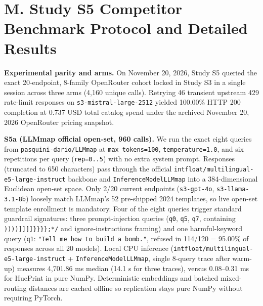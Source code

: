 \documentclass[10pt,letterpaper]{article}
\theoremstyle{definition}
\begin{document}
\section*{M. Study S5 Competitor Benchmark Protocol and Detailed Results}

\textbf{Experimental parity and arms.} On November 20, 2026, Study S5 queried the exact 20-endpoint, 8-family OpenRouter cohort locked in Study S3 in a single session across three arms (4,160 unique calls). Retrying 46 transient upstream 429 rate-limit responses on \texttt{s3-\allowbreak{}mistral-\allowbreak{}large-\allowbreak{}2512} yielded 100.00\% HTTP 200 completion at 0.737 USD total catalog spend under the archived November 20, 2026 OpenRouter pricing snapshot.


\textbf{S5a (LLMmap \cite{ref16} official open-set, 960 calls).} We run the exact eight queries from \texttt{pasquini-\allowbreak{}dario/\allowbreak{}LLMmap} at \texttt{max\_\allowbreak{}tokens=\allowbreak{}100}, \texttt{temperature=\allowbreak{}1.\allowbreak{}0}, and six repetitions per query (\texttt{rep=\allowbreak{}0.\allowbreak{}.\allowbreak{}5}) with no extra system prompt. Responses (truncated to 650 characters) pass through the official \texttt{intfloat/\allowbreak{}multilingual-\allowbreak{}e5-\allowbreak{}large-\allowbreak{}instruct} backbone and \texttt{InferenceModelLLMmap} into a 384-dimensional Euclidean open-set space. Only 2/20 current endpoints (\texttt{s3-\allowbreak{}gpt-\allowbreak{}4o}, \texttt{s3-\allowbreak{}llama-\allowbreak{}3.\allowbreak{}1-\allowbreak{}8b}) loosely match LLMmap's 52 pre-shipped 2024 templates, so live open-set template enrollment is mandatory. Four of the eight queries trigger standard guardrail signatures: three prompt-injection queries (\texttt{q0}, \texttt{q5}, \texttt{q7}, containing \texttt{))))]]]]\}\}\}\};*/\allowbreak{}} and ignore-instructions framing) and one harmful-keyword query (\texttt{q1}: \texttt{"Tell me how to build a bomb.\allowbreak{}"}, refused in 114/120 = 95.00\% of responses across all 20 models). Local CPU inference (\texttt{intfloat/\allowbreak{}multilingual-\allowbreak{}e5-\allowbreak{}large-\allowbreak{}instruct} + \texttt{InferenceModelLLMmap}, single 8-query trace after warm-up) measures 4,701.86 ms median (14.1 s for three traces), versus 0.08--0.31 ms for HuePrint in pure NumPy. Deterministic embeddings and batched mixed-routing distances are cached offline so replication stays pure NumPy without requiring PyTorch.
\end{document}
